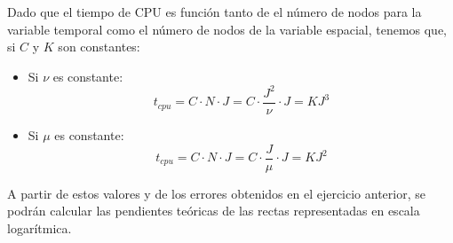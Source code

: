 \documentclass[spanish]{mathnotes}
\begin{document}
	
	Dado que el tiempo de \textsc{CPU} es función tanto de el número de nodos para la variable temporal como el número de nodos de la variable espacial, tenemos que, si $C$ y $K$ son constantes:
	
	\begin{itemize}
		\item Si $\nu$ es constante:
			$$t_{cpu}=C\cdot N\cdot J = C\cdot\frac{J^2}{\nu}\cdot J = KJ^3$$
		\item Si $\mu$ es constante:
			$$t_{cpu}=C\cdot N\cdot J = C\cdot\frac{J}{\mu}\cdot J = KJ^2$$
	\end{itemize}
	
	A partir de estos valores y de los errores obtenidos en el ejercicio anterior, se podrán calcular las pendientes teóricas de las rectas representadas en escala logarítmica.
	
\end{document}

